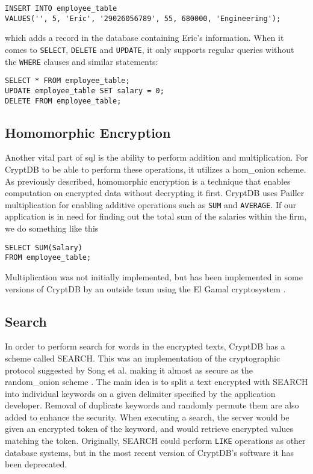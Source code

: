 \begin{verbatim}
INSERT INTO employee_table
VALUES('', 5, 'Eric', '29026056789', 55, 680000, 'Engineering');
\end{verbatim}

\noindent
which adds a record in the database containing Eric's information. When it comes to \verb!SELECT!, \verb!DELETE! and \verb!UPDATE!, it only supports regular queries without the \verb!WHERE! clauses and similar statements:

\begin{verbatim}
SELECT * FROM employee_table;
UPDATE employee_table SET salary = 0;
DELETE FROM employee_table;
\end{verbatim}



\subsection{Homomorphic Encryption}

Another vital part of \Gls{sql} is the ability to perform addition and multiplication. For CryptDB to be able to perform these operations, it utilizes a \Gls{hom_onion} scheme. As previously described, homomorphic encryption is a technique that enables computation on encrypted data without decrypting it first. CryptDB uses Pailler multiplication \cite{Paillier} for enabling additive operations such as \verb!SUM! and \verb!AVERAGE!. If our application is in need for finding out the total sum of the salaries within the firm, we do something like this

\begin{verbatim}
SELECT SUM(Salary)
FROM employee_table;
\end{verbatim}

\noindent
Multiplication was not initially implemented, but has been implemented in some versions of CryptDB by an outside team using the El Gamal cryptosystem \cite{cryptdb_guidelines}. 



\subsection{Search}

In order to perform search for words in the encrypted texts, CryptDB has a scheme called SEARCH. This was an implementation of the cryptographic protocol suggested by Song et al. making it almost as secure as the \gls{random_onion} scheme \citep{CryptDB_Main_Paper}. The main idea is to split a text encrypted with SEARCH into individual keywords on a given delimiter specified by the application developer. Removal of duplicate keywords and randomly permute them are also added to enhance the security. When executing a search, the server would be given an encrypted token of the keyword, and would retrieve encrypted values matching the token. Originally, SEARCH could perform \texttt{LIKE} operations as other database systems, but in the most recent version of CryptDB's software it has been deprecated. 

